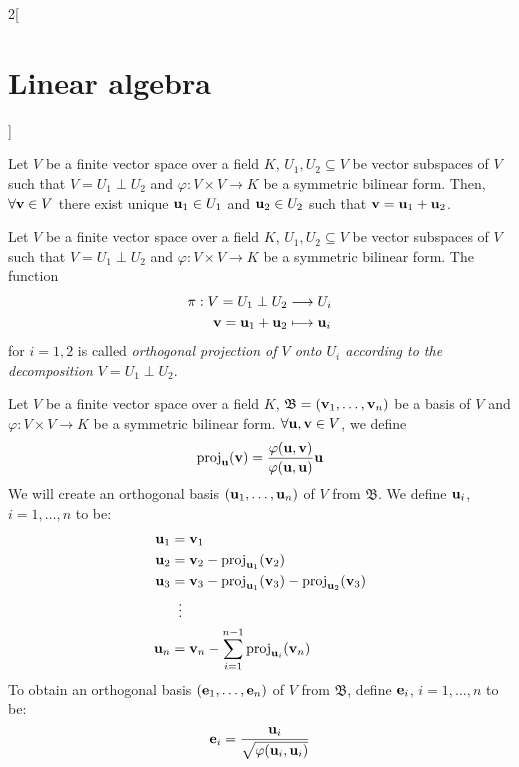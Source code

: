 \documentclass[../../../main.tex]{subfiles}
\begin{document}
\begin{multicols}{2}[\section{Linear algebra}]
\begin{definition}
  \end{definition}
  \begin{prop}
    Let $V$ be a finite vector space over a field $K$, $U_1,U_2\subseteq V$ be vector subspaces of $V$ such that $V=U_1\perp U_2$ and $\varphi:V\times V\rightarrow K$ be a symmetric bilinear form. Then, $\forall \vb{v}\in V$ there exist unique $\vb{u}_1\in U_1$ and $\vb{u}_2\in U_2$ such that $\vb{v}=\vb{u}_1+\vb{u}_2$.
  \end{prop}
  \begin{definition}\label{perpendicular}
    Let $V$ be a finite vector space over a field $K$, $U_1,U_2\subseteq V$ be vector subspaces of $V$ such that $V=U_1\perp U_2$ and $\varphi:V\times V\rightarrow K$ be a symmetric bilinear form. The function
    \begin{align*}
      \pi:V=U_1\perp U_2                            & \longrightarrow U_i         \\
      \vb{v}=\vb{u}_1+\vb{u}_2 & \longmapsto \vb{u}_i
    \end{align*}
    for $i=1,2$ is called \textit{orthogonal projection of $V$ onto $U_i$ according to the decomposition $V=U_1\perp U_2$}.
  \end{definition}
  \begin{method}
    Let $V$ be a finite vector space over a field $K$, $\mathfrak{B}=(\vb{v}_1,\ldots,\vb{v}_n)$ be a basis of $V$ and $\varphi:V\times V\rightarrow K$ be a symmetric bilinear form. $\forall\vb{u},\vb{v}\in V$, we define $$\text{proj}_{\vb{u}}(\vb{v})=\frac{\varphi(\vb{u},\vb{v})}{\varphi(\vb{u},\vb{u})}\vb{u}$$ We will create an orthogonal basis $(\vb{u}_1,\ldots,\vb{u}_n)$ of $V$ from $\mathfrak{B}$. We define $\vb{u}_i$, $i=1,\ldots,n$ to be:
    \begin{align*}
      \vb{u}_1 & =\vb{v}_1                                                                                               \\
      \vb{u}_2 & =\vb{v}_2-\text{proj}_{\vb{u}_1}(\vb{v}_2)                                                \\
      \vb{u}_3 & =\vb{v}_3-\text{proj}_{\vb{u}_1}(\vb{v}_3)-\text{proj}_{\vb{u}_2}(\vb{v}_3) \\
                      & \;\;\vdots                                                                                                     \\
      \vb{u}_n & =\vb{v}_n-\sum_{i=1}^{n-1}\text{proj}_{\vb{u}_i}(\vb{v}_n)
    \end{align*}
    To obtain an orthogonal basis $(\vb{e}_1,\ldots,\vb{e}_n)$ of $V$ from $\mathfrak{B}$, define $\vb{e}_i$, $i=1,\ldots,n$ to be: $$\vb{e}_i=\frac{\vb{u}_i}{\sqrt{\varphi(\vb{u}_i,\vb{u}_i)}}$$
  \end{method}

\end{multicols}
\end{document}
